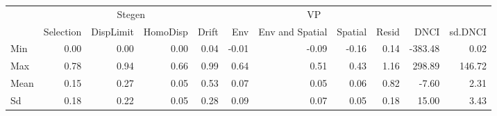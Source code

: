 \begin{longtable}{l|rrrrrrrrrr}
\toprule
\multicolumn{1}{l}{} & \multicolumn{4}{c}{Stegen} & \multicolumn{4}{c}{VP} &  &  \\ 
\cmidrule(lr){2-5} \cmidrule(lr){6-9}
\multicolumn{1}{l}{} & Selection & DispLimit & HomoDisp & Drift & Env & Env and Spatial & Spatial & Resid & DNCI & sd.DNCI \\ 
\midrule
Min & 0.00 & 0.00 & 0.00 & 0.04 & -0.01 & -0.09 & -0.16 & 0.14 & -383.48 & 0.02 \\ 
Max & 0.78 & 0.94 & 0.66 & 0.99 & 0.64 & 0.51 & 0.43 & 1.16 & 298.89 & 146.72 \\ 
Mean & 0.15 & 0.27 & 0.05 & 0.53 & 0.07 & 0.05 & 0.06 & 0.82 & -7.60 & 2.31 \\ 
Sd & 0.18 & 0.22 & 0.05 & 0.28 & 0.09 & 0.07 & 0.05 & 0.18 & 15.00 & 3.43 \\ 
\bottomrule
\end{longtable}

